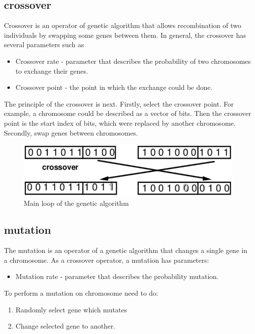 \subsection{crossover}
Crossover is an operator of genetic algorithm that allows recombination of two individuals by swapping some genes between them.
In general, the crossover has several parameters such as
\begin{itemize}
	\item Crossover rate - parameter that describes the probability of two chromosomes to exchange their genes.
	\item Crossover point - the point in which the exchange could be done.
\end{itemize}

The principle of the crossover is next.
Firstly, select the crossover point. For example, a chromosome could be described as a vector of bits. Then the crossover point is the start index of bits, which were replaced by another chromosome.
Secondly, swap genes between chromosomes.

\begin{figure}
	\centering
	\includegraphics[width=\textwidth]{images/crossoverVector.png}
	\caption{Main loop of the genetic algorithm}
	\label{fig:crossoverVector}
\end{figure}

\subsection{mutation}

The mutation is an operator of a genetic algorithm that changes a single gene in a chromosome. As a crossover operator, a mutation has parameters:

\begin{itemize}
	\item Mutation rate - parameter that describes the probability mutation.
\end{itemize}

To perform a mutation on chromosome need to do:
\begin{enumerate}
	\item Randomly select gene which mutates
	\item Change selected gene to another.
\end{enumerate}


